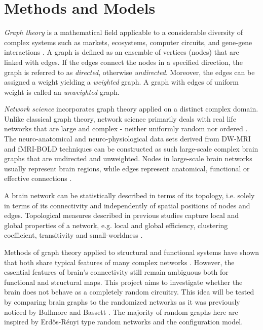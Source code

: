 
\chapter{Methods and Models} %

\label{Chapter2} %




\textit{Graph theory} is a mathematical field applicable to a considerable diversity of complex systems such as markets, ecosystems, computer circuits, and gene-gene interactions \citep{XYZ09}. A graph is defined as an ensemble of vertices (nodes) that are linked with edges. If the edges connect the nodes in a specified direction, the graph is referred to as \textit{directed}, otherwise \textit{undirected}. Moreover, the edges can be assigned a weight yielding a \textit{weighted} graph. A graph with edges of uniform weight is called an \textit{unweighted} graph.

\textit{Network science} incorporates graph theory applied on a   
distinct complex domain. Unlike classical graph theory, network science primarily deals with real life networks that are large and complex - neither uniformly random nor ordered \citep{RUB10}. The neuro-anatomical and neuro-physiological data sets derived from  DW-MRI and fMRI-BOLD techniques can be constructed as such large-scale complex brain graphs that are undirected and unweighted. Nodes in large-scale brain networks usually represent brain regions, while edges represent anatomical, functional or effective connections \citep{XYZ94}. 


A brain network can be statistically described in terms of its topology, i.e. solely in terms of its connectivity and independently of spatial positions of nodes and edges. Topological measures described in previous studies capture local and global properties of a network, e.g. local and global efficiency, clustering coefficient, transitivity and small-worldness \citep{LAT01, WAT98, NEW03, HUM08}.


Methods of graph theory applied to structural and functional systems have shown that both share typical features of many complex networks \citep{BUL09, RUB09, HEU11, VUK14}. However, the essential features of brain's connectivity still remain ambiguous both for functional and structural maps. This project aims to investigate whether the brain does not behave as a completely random circuitry. This idea will be tested by comparing brain graphs to the randomized networks as it was previously noticed by Bullmore and Bassett \citep{BUL11a}. The majority of random graphs here are inspired by  Erd\H{o}s-R\'{e}nyi type random networks and the configuration model. 
 

